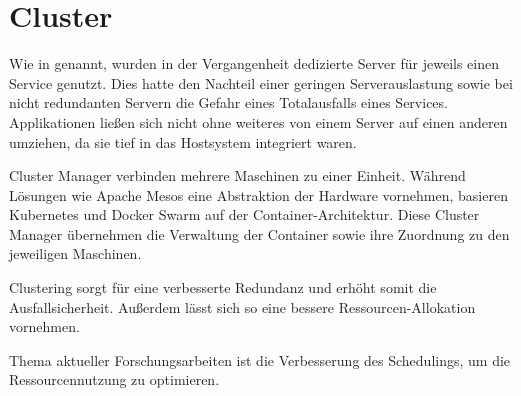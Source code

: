 \section{Cluster}
\label{sec:Cluster}
Wie in  genannt, wurden in der Vergangenheit dedizierte Server für jeweils einen Service genutzt.
Dies hatte den Nachteil einer geringen Serverauslastung sowie bei nicht redundanten Servern die Gefahr eines Totalausfalls eines Services.
Applikationen ließen sich nicht ohne weiteres von einem Server auf einen anderen umziehen, da sie tief in das Hostsystem integriert waren.

Cluster Manager verbinden mehrere Maschinen zu einer Einheit. Während Lösungen wie Apache Mesos eine Abstraktion der Hardware vornehmen, basieren Kubernetes und Docker Swarm auf der Container-Architektur.
Diese Cluster Manager übernehmen die Verwaltung der Container sowie ihre Zuordnung zu den jeweiligen Maschinen.

Clustering sorgt für eine verbesserte Redundanz und erhöht somit die Ausfallsicherheit.
Außerdem lässt sich so eine bessere Ressourcen-Allokation vornehmen.

Thema aktueller Forschungsarbeiten ist die Verbesserung des Schedulings, um die Ressourcennutzung zu optimieren. \citep{Liu2018}

